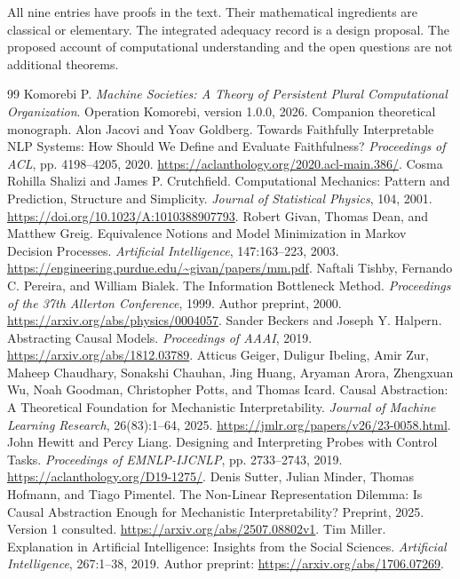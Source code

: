 \documentclass[11pt,letterpaper]{article}
\theoremstyle{plain}
\theoremstyle{definition}
\begin{document}
All nine entries have proofs in the text. Their mathematical ingredients are classical or elementary. The integrated adequacy record is a design proposal. The proposed account of computational understanding and the open questions are not additional theorems.

\clearpage
{}
\begin{thebibliography}{99}\small
{} Komorebi P. \emph{Machine Societies: A Theory of Persistent Plural Computational Organization}. Operation Komorebi, version 1.0.0, 2026. Companion theoretical monograph.
 Alon Jacovi and Yoav Goldberg. Towards Faithfully Interpretable NLP Systems: How Should We Define and Evaluate Faithfulness? \emph{Proceedings of ACL}, pp. 4198--4205, 2020. \url{https://aclanthology.org/2020.acl-main.386/}.
 Cosma Rohilla Shalizi and James P. Crutchfield. Computational Mechanics: Pattern and Prediction, Structure and Simplicity. \emph{Journal of Statistical Physics}, 104, 2001. \url{https://doi.org/10.1023/A:1010388907793}.
 Robert Givan, Thomas Dean, and Matthew Greig. Equivalence Notions and Model Minimization in Markov Decision Processes. \emph{Artificial Intelligence}, 147:163--223, 2003. \url{https://engineering.purdue.edu/~givan/papers/mm.pdf}.
 Naftali Tishby, Fernando C. Pereira, and William Bialek. The Information Bottleneck Method. \emph{Proceedings of the 37th Allerton Conference}, 1999. Author preprint, 2000. \url{https://arxiv.org/abs/physics/0004057}.
 Sander Beckers and Joseph Y. Halpern. Abstracting Causal Models. \emph{Proceedings of AAAI}, 2019. \url{https://arxiv.org/abs/1812.03789}.
 Atticus Geiger, Duligur Ibeling, Amir Zur, Maheep Chaudhary, Sonakshi Chauhan, Jing Huang, Aryaman Arora, Zhengxuan Wu, Noah Goodman, Christopher Potts, and Thomas Icard. Causal Abstraction: A Theoretical Foundation for Mechanistic Interpretability. \emph{Journal of Machine Learning Research}, 26(83):1--64, 2025. \url{https://jmlr.org/papers/v26/23-0058.html}.
 John Hewitt and Percy Liang. Designing and Interpreting Probes with Control Tasks. \emph{Proceedings of EMNLP-IJCNLP}, pp. 2733--2743, 2019. \url{https://aclanthology.org/D19-1275/}.
 Denis Sutter, Julian Minder, Thomas Hofmann, and Tiago Pimentel. The Non-Linear Representation Dilemma: Is Causal Abstraction Enough for Mechanistic Interpretability? Preprint, 2025. Version 1 consulted. \url{https://arxiv.org/abs/2507.08802v1}.
 Tim Miller. Explanation in Artificial Intelligence: Insights from the Social Sciences. \emph{Artificial Intelligence}, 267:1--38, 2019. Author preprint: \url{https://arxiv.org/abs/1706.07269}.

\end{thebibliography}
\end{document}

